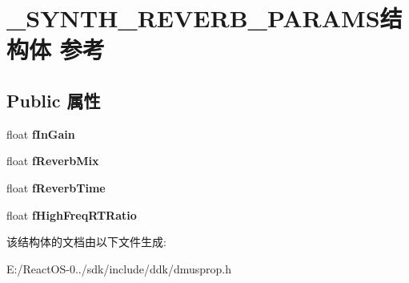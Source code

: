 \hypertarget{struct___s_y_n_t_h___r_e_v_e_r_b___p_a_r_a_m_s}{}\section{\+\_\+\+S\+Y\+N\+T\+H\+\_\+\+R\+E\+V\+E\+R\+B\+\_\+\+P\+A\+R\+A\+M\+S结构体 参考}
\label{struct___s_y_n_t_h___r_e_v_e_r_b___p_a_r_a_m_s}
\subsection*{Public 属性}
\begin{DoxyCompactItemize}
\item 
\mbox{\label{struct___s_y_n_t_h___r_e_v_e_r_b___p_a_r_a_m_s_a4d9934aa1455c7b324e3839a3fcffa67}} 
float {\bfseries f\+In\+Gain}
\item 
\mbox{\label{struct___s_y_n_t_h___r_e_v_e_r_b___p_a_r_a_m_s_a5d3365c6a7a7959bb145a97adab1267c}} 
float {\bfseries f\+Reverb\+Mix}
\item 
\mbox{\label{struct___s_y_n_t_h___r_e_v_e_r_b___p_a_r_a_m_s_a4141faab5243d61946b5651530970648}} 
float {\bfseries f\+Reverb\+Time}
\item 
\mbox{\label{struct___s_y_n_t_h___r_e_v_e_r_b___p_a_r_a_m_s_a869fa6312babb02d9684592b2bacfe33}} 
float {\bfseries f\+High\+Freq\+R\+T\+Ratio}
\end{DoxyCompactItemize}


该结构体的文档由以下文件生成\+:\begin{DoxyCompactItemize}
\item 
E\+:/\+React\+O\+S-\/0../sdk/include/ddk/dmusprop.\+h\end{DoxyCompactItemize}

